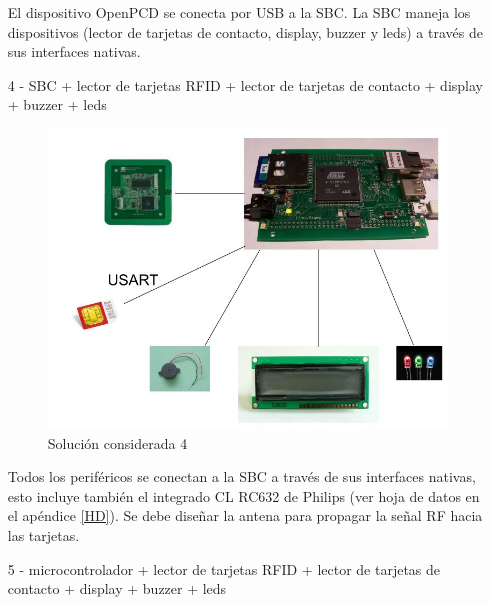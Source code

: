 \begin{itemize}
El dispositivo OpenPCD se conecta por USB a la SBC. La SBC maneja los dispositivos (lector de tarjetas de contacto, display, buzzer y leds) a través de sus interfaces nativas.

\bigskip
\item[4 -] SBC + lector de tarjetas RFID + lector de tarjetas de contacto + display + buzzer + leds
\bigskip

\begin{figure}[H]
\centering
  \begin{center}
  \includegraphics[scale=.25]{Imagenes/3.jpg} 
  \end{center}
  \caption{Solución considerada 4}\label{Fig:HW4} 
\end{figure}

Todos los periféricos se conectan a la SBC a través de sus interfaces nativas, esto incluye también el integrado CL RC632 de Philips \cite{RC632} (ver hoja de datos en el apéndice \ref{HD}). Se debe diseñar la antena para propagar la señal RF hacia las tarjetas.

\bigskip
\item[5 -] microcontrolador + lector de tarjetas RFID + lector de tarjetas de contacto + display + buzzer + leds
\bigskip


\end{itemize}
